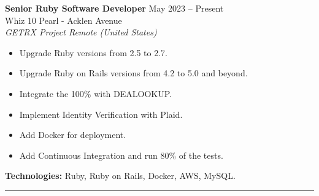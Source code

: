 \textbf{Senior Ruby Software Developer} \hfill May 2023 – Present\\
Whiz 10 Pearl - Acklen Avenue\\
\textit{GETRX Project Remote (United States)}
\begin{itemize}
    \setlength{\itemsep}{0pt} %
    \setlength{\topsep}{0pt}  %
    \setlength{\parsep}{0pt}  %
    \setlength{\partopsep}{0pt} %
    \item Upgrade Ruby versions from 2.5 to 2.7.
    \item Upgrade Ruby on Rails versions from 4.2 to 5.0 and beyond.
    \item Integrate the 100\% with DEALOOKUP.
    \item Implement Identity Verification with Plaid.
    \item Add Docker for deployment.
    \item Add Continuous Integration and run 80\% of the tests.
\end{itemize}
\textbf{Technologies:} Ruby, Ruby on Rails, Docker, AWS, MySQL.
\hrule
\vspace{1em}